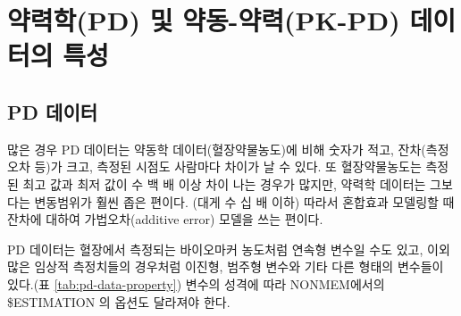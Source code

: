 \documentclass[
  11pt,
  krantz2, a4paper, twoside]{krantz}
\theoremstyle{definition}
\theoremstyle{definition}
\theoremstyle{definition}
\theoremstyle{remark}
\begin{document}
\hypertarget{uxc57duxb825uxd559pd-uxbc0f-uxc57duxb3d9-uxc57duxb825pk-pd-uxb370uxc774uxd130uxc758-uxd2b9uxc131}{%
\section{약력학(PD) 및 약동-약력(PK-PD) 데이터의 특성}\label{uxc57duxb825uxd559pd-uxbc0f-uxc57duxb3d9-uxc57duxb825pk-pd-uxb370uxc774uxd130uxc758-uxd2b9uxc131}}

\hypertarget{pd-uxb370uxc774uxd130}{%
\subsection{PD 데이터}\label{pd-uxb370uxc774uxd130}}

많은 경우 PD 데이터는 약동학 데이터(혈장약물농도)에 비해 숫자가 적고, 잔차(측정오차 등)가 크고, 측정된 시점도 사람마다 차이가 날 수 있다. 또 혈장약물농도는 측정된 최고 값과 최저 값이 수 백 배 이상 차이 나는 경우가 많지만, 약력학 데이터는 그보다는 변동범위가 훨씬 좁은 편이다. (대게 수 십 배 이하) 따라서 혼합효과 모델링할 때 잔차에 대하여 가법오차(additive error) 모델을 쓰는 편이다.

PD 데이터는 혈장에서 측정되는 바이오마커 농도처럼 연속형 변수일 수도 있고, 이외 많은 임상적 측정치들의 경우처럼 이진형, 범주형 변수와 기타 다른 형태의 변수들이 있다.(표 \ref{tab:pd-data-property}) 변수의 성격에 따라 NONMEM에서의 \$ESTIMATION 의 옵션도 달라져야 한다.

\end{document}
